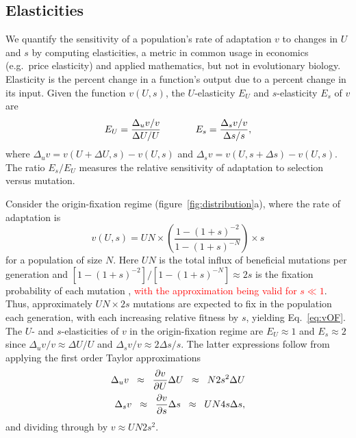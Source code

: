 \documentclass[9pt,twocolumn,twoside]{article}
\begin{document}
\subsection{Elasticities} \label{subsec:materials:characterizeMDA}

We quantify the sensitivity of a population's rate of adaptation $v$ to changes in $U$ and $s$ by computing elasticities, a metric in common usage in economics (e.g.~price elasticity) and applied mathematics, but not in evolutionary biology. Elasticity is the percent change in a function's output due to a percent change in its input. Given the function $v(U,s)$, the $U$-elasticity $E_U$ and $s$-elasticity $E_s$ of $v$ are
\begin{equation} \label{eq:elasticities}
    E_U = \frac{\Delta_u v / v}{\Delta U / U} \hspace{.5in} E_s = \frac{\Delta_s v / v}{\Delta s / s},
\end{equation}
where $\Delta_u v = v(U+\Delta U,s)-v(U,s)$ and $\Delta_s v = v(U,s+\Delta s)-v(U,s)$. The ratio $E_s/E_U$ measures the relative sensitivity of adaptation to selection versus mutation.

Consider the origin-fixation regime (figure~\ref{fig:distribution}a), where the rate of adaptation is 
\begin{equation} \label{eq:vOF}
v(U,s)=UN\times \left(\frac{1-(1+s)^{-2}}{1-(1+s)^{-N}}\right) \times s
\end{equation}
for a population of size $N$. Here $UN$ is the total influx of beneficial mutations per generation and $[1-(1+s)^{-2}]/[1-(1+s)^{-N}]\approx 2s$ is the fixation probability of each mutation \citep[][Equation 2]{sella2005application}, \textcolor{red}{with the approximation being valid for $s \ll 1$}. Thus, approximately $ UN\times 2s$ mutations are expected to fix in the population each generation, with each increasing relative fitness by $s$, yielding Eq.~\eqref{eq:vOF}. The $U$- and $s$-elasticities of $v$ in the origin-fixation regime are $E_U \approx 1$ and $E_s \approx 2$ since $\Delta_u v/v \approx \Delta U/U$ and $\Delta_s v/v \approx 2\Delta s/s$. The latter expressions follow from applying the first order Taylor approximations 
\[
\begin{aligned}
\Delta_u v \hspace{.2cm}\approx \hspace{.2cm}\frac{\partial v}{\partial U}\Delta U \hspace{.2cm}\approx \hspace{.2cm}N2s^2\Delta U\\[1pt]
\Delta_s v \hspace{.2cm}\approx \hspace{.2cm}\frac{\partial v}{\partial s} \Delta s \hspace{.2cm}\approx\hspace{.2cm} UN4s\Delta s,
\end{aligned}
\]
and dividing through by $v\approx UN2s^2$.
\end{document}
